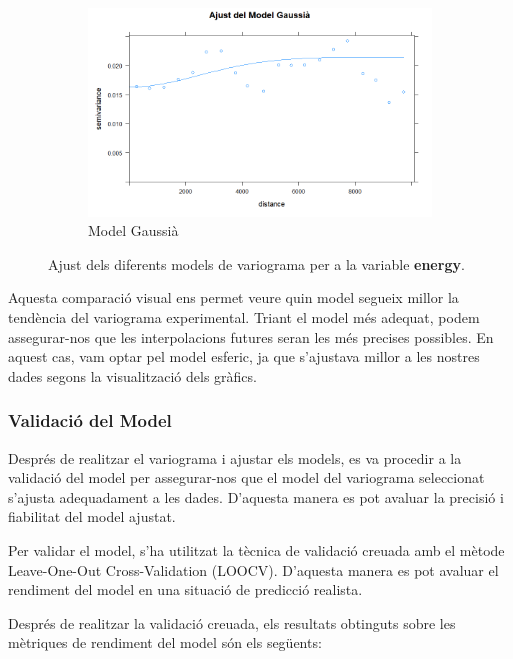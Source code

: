 \begin{figure}[ht]
\begin{subfigure}[b]{0.32\textwidth}
        \includegraphics[width=\textwidth]{Images/7_Geospatial/2_modeling/model_gaussia.png}
        \caption{Model Gaussià}
        \label{fig:gaussian}
    \end{subfigure}
    \caption{Ajust dels diferents models de variograma per a la variable \textbf{energy}.}
    \label{fig:variograma_models}
\end{figure}

Aquesta comparació visual ens permet veure quin model segueix millor la tendència del variograma experimental. Triant el model més adequat, podem assegurar-nos que les interpolacions futures seran les més precises possibles. En aquest cas, vam optar pel model esferic, ja que s'ajustava millor a les nostres dades segons la visualització dels gràfics.

\subsubsection{Validació del Model}
Després de realitzar el variograma i ajustar els models, es va procedir a la validació del model per assegurar-nos que el model del variograma seleccionat s'ajusta adequadament a les dades. D'aquesta manera es pot avaluar la precisió i fiabilitat del model ajustat.

Per validar el model, s'ha utilitzat la tècnica de validació creuada amb el mètode Leave-One-Out Cross-Validation (LOOCV). D'aquesta manera es pot avaluar el rendiment del model en una situació de predicció realista.

Després de realitzar la validació creuada, els resultats obtinguts sobre les mètriques de rendiment del model són els següents: \\ \\


